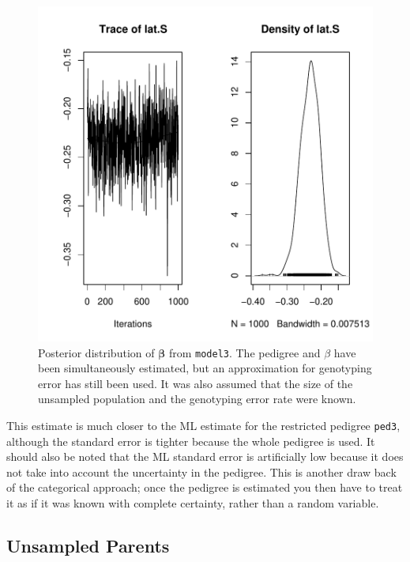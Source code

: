\documentclass{article}
\begin{document}
\begin{figure}[!h]
\begin{center}
\includegraphics{Tutorial-028}
\end{center}
\caption{Posterior distribution of $\bm{\beta}$ from \texttt{model3}. The pedigree and $\beta$ have been simultaneously estimated, but an approximation for genotyping error has still been used. It was also assumed that the size of the unsampled population and the genotyping error rate were known.}
\label{model3beta-fig}
\end{figure}


This estimate is much closer to the ML estimate for the restricted pedigree \texttt{ped3}, although the standard error is tighter because the whole pedigree is used.  It should also be noted that the ML standard error is artificially low because it does not take into account the uncertainty in the pedigree.  This is another draw back of the categorical approach; once the pedigree is estimated you then have to treat it as if it was known with complete certainty, rather than a random variable. \\

\subsection{Unsampled Parents}
\label{us-sec}
\end{document}
